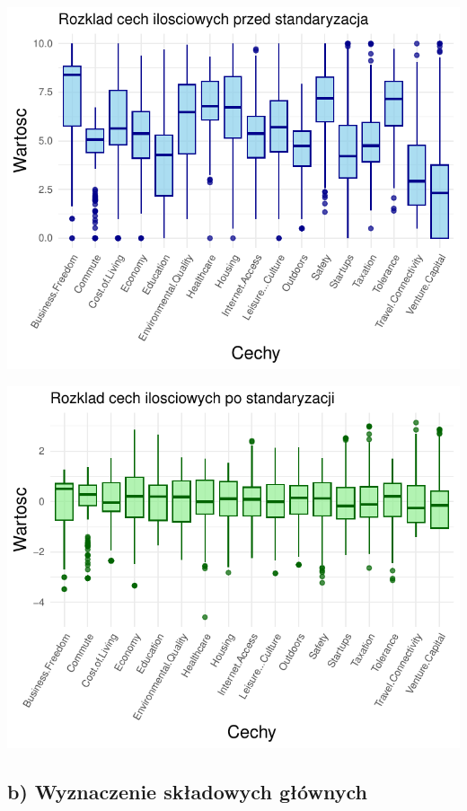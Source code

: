 \documentclass[
  12pt,
]{article}
\begin{document}
\begin{center}\includegraphics{Sprawozdanie2_files/figure-latex/wykresy_rozkładów_standaryzacja_boxplot-1} \end{center}

\begin{center}\includegraphics{Sprawozdanie2_files/figure-latex/wykresy_rozkładów_standaryzacja_boxplot-2} \end{center}

\subsection{b) Wyznaczenie składowych
głównych}\label{b-wyznaczenie-skux142adowych-gux142uxf3wnych}
\end{document}
